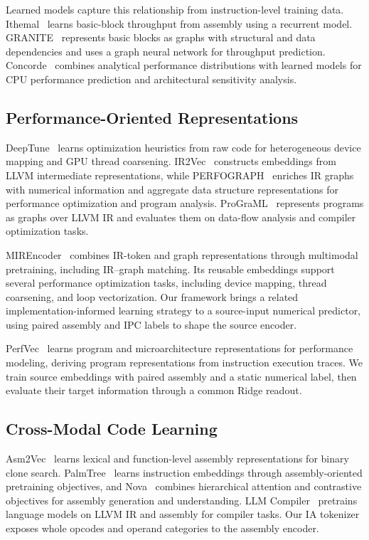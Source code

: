 \documentclass[conference]{IEEEtran}
\begin{document}
Learned models capture this relationship from instruction-level training data. Ithemal~\cite{mendis2019ithemal} learns basic-block throughput from assembly using a recurrent model. GRANITE~\cite{sykora2022granite} represents basic blocks as graphs with structural and data dependencies and uses a graph neural network for throughput prediction. Concorde~\cite{nasr2025concorde} combines analytical performance distributions with learned models for CPU performance prediction and architectural sensitivity analysis.

\subsection{Performance-Oriented Representations}
DeepTune~\cite{cummins2017deeptune} learns optimization heuristics from raw code for heterogeneous device mapping and GPU thread coarsening. IR2Vec~\cite{ir2vec2020} constructs embeddings from LLVM intermediate representations, while PERFOGRAPH~\cite{tehranijamsaz2023perfograph} enriches IR graphs with numerical information and aggregate data structure representations for performance optimization and program analysis. ProGraML~\cite{cummins2021programl} represents programs as graphs over LLVM IR and evaluates them on data-flow analysis and compiler optimization tasks.

MIREncoder~\cite{dutta2024mirencoder} combines IR-token and graph representations through multimodal pretraining, including IR--graph matching. Its reusable embeddings support several performance optimization tasks, including device mapping, thread coarsening, and loop vectorization. Our framework brings a related implementation-informed learning strategy to a source-input numerical predictor, using paired assembly and IPC labels to shape the source encoder.

PerfVec~\cite{li2024perfvec} learns program and microarchitecture representations for performance modeling, deriving program representations from instruction execution traces. We train source embeddings with paired assembly and a static numerical label, then evaluate their target information through a common Ridge readout.

\subsection{Cross-Modal Code Learning}
Asm2Vec~\cite{ding2019asm2vec} learns lexical and function-level assembly representations for binary clone search. PalmTree~\cite{palmtree2021} learns instruction embeddings through assembly-oriented pretraining objectives, and Nova~\cite{jiang2025nova} combines hierarchical attention and contrastive objectives for assembly generation and understanding. LLM Compiler~\cite{cummins2024llmcompiler} pretrains language models on LLVM IR and assembly for compiler tasks. Our IA tokenizer exposes whole opcodes and operand categories to the assembly encoder.
\end{document}
